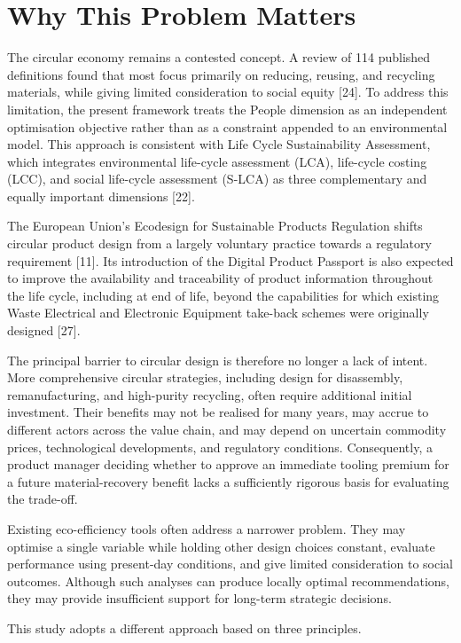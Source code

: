 \documentclass[11pt,a4paper]{article}
\begin{document}
\section{Why This Problem Matters}

The circular economy remains a contested concept. A review of 114 published
definitions found that most focus primarily on reducing, reusing, and
recycling materials, while giving limited consideration to social equity
[24]. To address this limitation, the present framework treats the People
dimension as an independent optimisation objective rather than as a
constraint appended to an environmental model. This approach is consistent
with Life Cycle Sustainability Assessment, which integrates environmental
life-cycle assessment (LCA), life-cycle costing (LCC), and social
life-cycle assessment (S-LCA) as three complementary and equally important
dimensions [22].

The European Union's Ecodesign for Sustainable Products Regulation shifts
circular product design from a largely voluntary practice towards a
regulatory requirement [11]. Its introduction of the Digital Product
Passport is also expected to improve the availability and traceability of
product information throughout the life cycle, including at end of life,
beyond the capabilities for which existing Waste Electrical and Electronic
Equipment take-back schemes were originally designed [27].

The principal barrier to circular design is therefore no longer a lack of
intent. More comprehensive circular strategies, including design for
disassembly, remanufacturing, and high-purity recycling, often require
additional initial investment. Their benefits may not be realised for many
years, may accrue to different actors across the value chain, and may
depend on uncertain commodity prices, technological developments, and
regulatory conditions. Consequently, a product manager deciding whether to
approve an immediate tooling premium for a future material-recovery benefit
lacks a sufficiently rigorous basis for evaluating the trade-off.

Existing eco-efficiency tools often address a narrower problem. They may
optimise a single variable while holding other design choices constant,
evaluate performance using present-day conditions, and give limited
consideration to social outcomes. Although such analyses can produce
locally optimal recommendations, they may provide insufficient support for
long-term strategic decisions.

This study adopts a different approach based on three principles.
\end{document}
